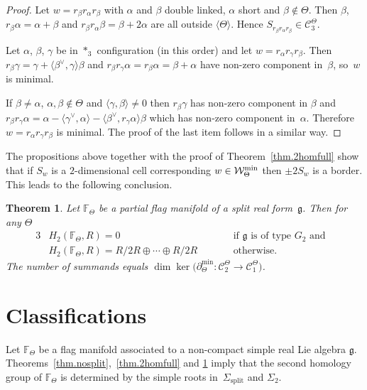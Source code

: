 \documentclass[10pt,a4paper]{amsart}
\numberwithin{equation}{section}
\newtheorem{Theorem}{Theorem}[section]
\begin{document}
\begin{proof}Let $w= r_\beta r_\alpha r_\beta$ with $\alpha$ and $\beta$ double linked, $\alpha$ short and $\beta\notin\Theta$. Then $\beta$, $r_\beta\alpha=\alpha+\beta $ and $r_\beta r_\alpha\beta=\beta+2\alpha$ are all outside $\langle \Theta\rangle$. Hence $S_{r_\beta r_\alpha r_\beta}\in \mathcal{C}_3^\Theta$.

Let $\alpha$, $\beta$, $\gamma$ be in $*_3$ configuration (in this order) and let $w= r_{\alpha }r_{\gamma }r_{\beta }$. Then $r_\beta\gamma=\gamma+\langle \beta^\vee,\gamma\rangle\beta$ and $r_\beta r_\gamma\alpha=r_\beta\alpha=\beta+\alpha$ have non-zero component in~$\beta$, so~$w$ is minimal.

If $\beta\neq \alpha$, $\alpha,\beta\notin\Theta$ and $\langle\gamma,\beta\rangle\neq 0$ then $r_\beta\gamma$ has non-zero component in $\beta$ and $r_\beta r_\gamma\alpha=\alpha-\langle\gamma^\vee,\alpha\rangle-\langle
\beta^\vee,r_\gamma\alpha\rangle\beta$ which has non-zero component in~$\alpha$. Therefore $w=r_\alpha r_\gamma r_\beta $ is minimal. The proof of the last item follows in a similar way.
\end{proof}

The propositions above together with the proof of Theorem~\ref{thm.2homfull} show that if $S_w$ is a $2$-di\-men\-sional cell corresponding $w\in \mathcal W_\Theta^{\rm min}$ then $\pm 2 S_w$ is a border. This leads to the following conclusion.

\begin{Theorem}\label{thm.2homint}Let $\mathbb{F}_{\Theta }$ be a partial flag manifold of a split real form~$\mathfrak{g}$. Then for any $\Theta $
\begin{alignat*}{3}
& H_{2} ( \mathbb{F}_{\Theta },R ) = 0 \qquad && \mbox{if }\mathfrak{g} \mbox{ is of type }G_{2}\mbox{ and}& \\
& H_{2} ( \mathbb{F}_{\Theta },R ) = R/2R\oplus \cdots \oplus R/2R \qquad && \mbox{otherwise}. &
\end{alignat*}
The number of summands equals $\dim \ker \big(\partial _{\Theta }^{\min }\colon \mathcal{C}_{2}^{\Theta }\longrightarrow \mathcal{C}_{1}^{\Theta }\big)$.
\end{Theorem}

\section{Classifications}

Let $\mathbb{F}_{\Theta }$ be a flag manifold associated to a non-compact simple real Lie algebra $\mathfrak{g}$. Theorems~\ref{thm.nosplit},~\ref{thm.2homfull} and \ref{thm.2homint} imply that the second homology group of $\mathbb{F}_{\Theta }$ is determined by the simple roots in~$\Sigma _{\mathrm{split}}$ and $\Sigma _{2}$.
\end{document}
